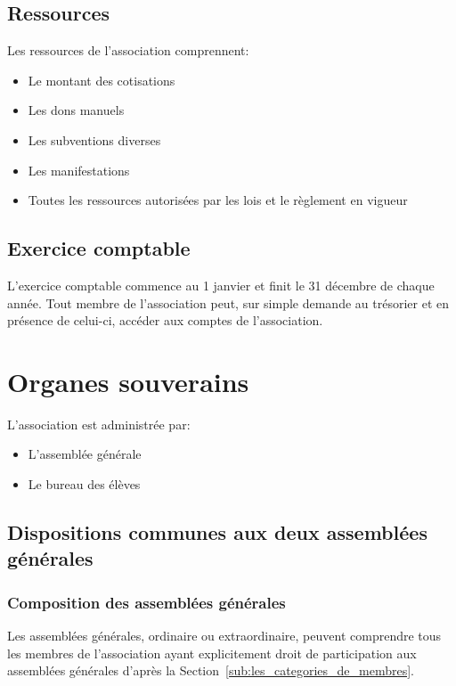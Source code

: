 \documentclass{article}
\begin{document}
		\subsection{Ressources}
			Les ressources de l’association comprennent:
			\begin{itemize}
				\item Le montant des cotisations
				\item Les dons manuels
				\item Les subventions diverses
				\item Les manifestations
				\item Toutes les ressources autorisées par les lois et le
					règlement en vigueur
			\end{itemize}

		\subsection{Exercice comptable}
			L’exercice comptable commence au 1 janvier et finit le 31
			décembre de chaque année. Tout membre de l’association peut, sur
			simple demande au trésorier et en présence de celui-ci, accéder aux
			comptes de l’association.

	\section{Organes souverains}
		L’association est administrée par:
		\begin{itemize}
			\item L’assemblée générale
			\item Le bureau des élèves
		\end{itemize}

		\subsection{Dispositions communes aux deux assemblées générales}
			\subsubsection{Composition des assemblées générales}
				Les assemblées générales, ordinaire ou extraordinaire, peuvent
				comprendre tous les membres de l’association ayant explicitement
				droit de participation aux assemblées générales d'après la
				Section~\ref{sub:les_categories_de_membres}.
\end{document}
